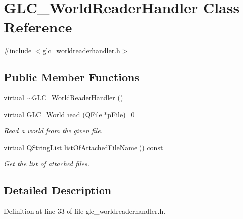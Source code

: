 \hypertarget{class_g_l_c___world_reader_handler}{\section{G\-L\-C\-\_\-\-World\-Reader\-Handler Class Reference}
\label{class_g_l_c___world_reader_handler}
}


{\ttfamily \#include $<$glc\-\_\-worldreaderhandler.\-h$>$}

\subsection*{Public Member Functions}
\begin{DoxyCompactItemize}
\item 
virtual \hyperlink{class_g_l_c___world_reader_handler_a95180a425ff63c0ca6c49af217c2c06f}{$\sim$\-G\-L\-C\-\_\-\-World\-Reader\-Handler} ()
\item 
virtual \hyperlink{class_g_l_c___world}{G\-L\-C\-\_\-\-World} \hyperlink{class_g_l_c___world_reader_handler_a5ae742d3c96d55077ed4bb6fad28f0b6}{read} (Q\-File $\ast$p\-File)=0
\begin{DoxyCompactList}\small\item\em Read a world from the given file. \end{DoxyCompactList}\item 
virtual Q\-String\-List \hyperlink{class_g_l_c___world_reader_handler_a5517faa201c48dbdf7611e2dd9bb427c}{list\-Of\-Attached\-File\-Name} () const 
\begin{DoxyCompactList}\small\item\em Get the list of attached files. \end{DoxyCompactList}\end{DoxyCompactItemize}


\subsection{Detailed Description}


Definition at line 33 of file glc\-\_\-worldreaderhandler.\-h.




